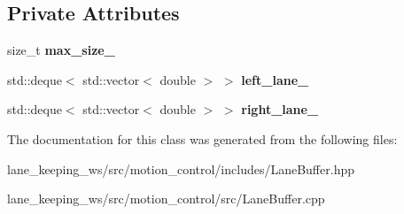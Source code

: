 \subsection*{Private Attributes}
\begin{DoxyCompactItemize}
\item 
\mbox{\label{classLaneBuffer_afabb27169371ebf7b9ecec0bc6ac9757}} 
size\+\_\+t {\bfseries max\+\_\+size\+\_\+}
\item 
\mbox{\label{classLaneBuffer_a04a15a527a56822527ede138f916d23a}} 
std\+::deque$<$ std\+::vector$<$ double $>$ $>$ {\bfseries left\+\_\+lane\+\_\+}
\item 
\mbox{\label{classLaneBuffer_abb489a9391c6013769600f0433ab80dc}} 
std\+::deque$<$ std\+::vector$<$ double $>$ $>$ {\bfseries right\+\_\+lane\+\_\+}
\end{DoxyCompactItemize}


The documentation for this class was generated from the following files\+:\begin{DoxyCompactItemize}
\item 
lane\+\_\+keeping\+\_\+ws/src/motion\+\_\+control/includes/Lane\+Buffer.\+hpp\item 
lane\+\_\+keeping\+\_\+ws/src/motion\+\_\+control/src/Lane\+Buffer.\+cpp\end{DoxyCompactItemize}
